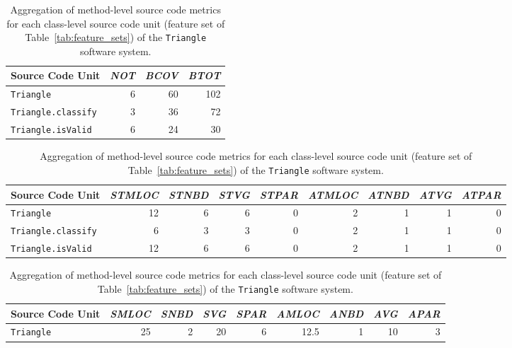 \begin{table}
  \centering
  \caption{Extracted coverage test suite metrics (feature set  of Table~\ref{tab:feature_sets}) of the \texttt{Triangle} software system.}
  \label{tab:triangle_coverage_metrics}
  \begin{tabular}{|l|r|r|r|}
    \hline
    \rowcolor[RGB]{169,196,223}
    \textbf{Source Code Unit} & \textbf{\emph{NOT}} & \textbf{\emph{BCOV}} & \textbf{\emph{BTOT}} \\
    \hline \texttt{Triangle} & 6 & 60 & 102 \\
    \hline \texttt{Triangle.classify} & 3 & 36 & 72 \\
    \hline \texttt{Triangle.isValid} & 6 & 24 & 30 \\
    \hline
  \end{tabular}
  
  \vspace{3em}
  
  \centering
  \caption{Merged test suite metrics (feature set  in Table~\ref{tab:feature_sets}) for each source code unit of the \texttt{Triangle} software system.}
  \label{tab:triangle_merge_test_metrics}
  \begin{tabular}{|l|r|r|r|r|r|r|r|r|}
    \hline
    \rowcolor[RGB]{169,196,223}
    \textbf{Source Code Unit} & \textbf{\emph{STMLOC}} & \textbf{\emph{STNBD}} & \textbf{\emph{STVG}} & \textbf{\emph{STPAR}} & \textbf{\emph{ATMLOC}} & \textbf{\emph{ATNBD}} & \textbf{\emph{ATVG}} & \textbf{\emph{ATPAR}}  \\
    \hline \texttt{Triangle} & 12 & 6 & 6 & 0 & 2 & 1 & 1 & 0 \\
    \hline \texttt{Triangle.classify} & 6 & 3 & 3 & 0 & 2 & 1 & 1 & 0 \\
    \hline \texttt{Triangle.isValid} & 12 & 6 & 6 & 0 & 2 & 1 & 1 & 0 \\
    \hline
  \end{tabular}

  \vspace{3em}

  \centering
  \caption{Aggregation of method-level source code metrics for each class-level source code unit (feature set  of Table~\ref{tab:feature_sets}) of the \texttt{Triangle} software system.}
  \label{tab:triangle_aggregate_metrics}
  \begin{tabular}{|l|r|r|r|r|r|r|r|r|}
    \hline
    \rowcolor[RGB]{169,196,223}
    \textbf{Source Code Unit} & \textbf{\emph{SMLOC}} & \textbf{\emph{SNBD}} & \textbf{\emph{SVG}} & \textbf{\emph{SPAR}} & \textbf{\emph{AMLOC}} & \textbf{\emph{ANBD}} & \textbf{\emph{AVG}} & \textbf{\emph{APAR}}  \\
    \hline \texttt{Triangle} & 25 & 2 & 20 & 6 & 12.5 & 1 & 10 & 3 \\
    \hline
  \end{tabular}
\end{table}
\afterpage\clearpage


